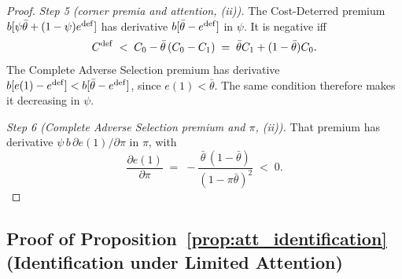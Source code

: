 \begin{proof}
\emph{Step 5 (corner premia and attention, (ii)).} The Cost-Deterred premium $b[\psi\bar\theta+(1-\psi)e^{\rm def}]$ has derivative $b[\bar\theta-e^{\rm def}]$ in $\psi$. It is negative iff
\begin{equation*}
    C^{\rm def}\;<\;C_0-\bar\theta\,(C_0-C_1)\;=\;\bar\theta C_1+(1-\bar\theta)C_0 .
\end{equation*}
The Complete Adverse Selection premium has derivative $b[e(1)-e^{\rm def}]<b[\bar\theta-e^{\rm def}]$, since $e(1)<\bar\theta$. The same condition therefore makes it decreasing in $\psi$.

\emph{Step 6 (Complete Adverse Selection premium and $\pi$, (ii)).} That premium has derivative $\psi\,b\,\partial e(1)/\partial\pi$ in $\pi$, with
\begin{equation*}
    \frac{\partial e(1)}{\partial\pi}\;=\;-\frac{\bar\theta\,(1-\bar\theta)}{(1-\pi\bar\theta)^2}\;<\;0 .
\end{equation*}
\end{proof}

\subsection*{Proof of Proposition~\ref{prop:att_identification} (Identification under Limited Attention)}

